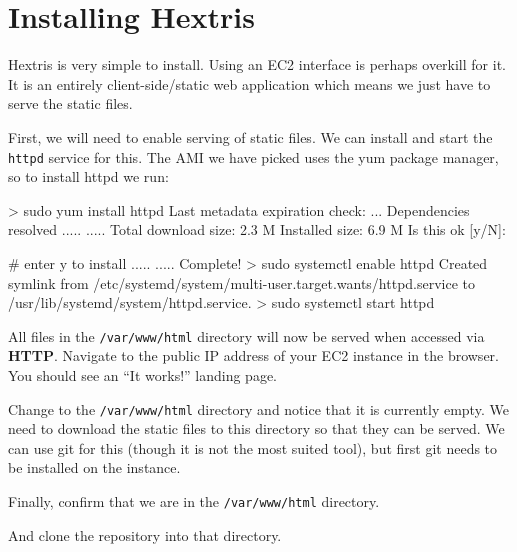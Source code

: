 \documentclass{csse4400}
\begin{document}
\section{Installing Hextris}\label{sec:installHextris}
Hextris \cite{hextris} is very simple to install. Using an EC2 interface is perhaps overkill for it.
It is an entirely client-side/static web application which means we just have to serve the static files.

First, we will need to enable serving of static files.
We can install and start the \texttt{httpd} service for this.
The AMI we have picked uses the yum package manager, so to install httpd we run:

\begin{code}[language=bash,numbers=none]{}
> sudo yum install httpd
Last metadata expiration check: ...
Dependencies resolved
..... 
..... 
Total download size: 2.3 M
Installed size: 6.9 M
Is this ok [y/N]:

# enter y to install
..... 
..... 
Complete!
> sudo systemctl enable httpd
Created symlink from /etc/systemd/system/multi-user.target.wants/httpd.service to /usr/lib/systemd/system/httpd.service.
> sudo systemctl start httpd
\end{code}

All files in the \texttt{/var/www/html} directory will now be served when accessed via \textbf{HTTP}.
Navigate to the public IP address of your EC2 instance in the browser.
You should see an ``It works!'' landing page.

Change to the \texttt{/var/www/html} directory and notice that it is currently empty.
We need to download the static files to this directory so that they can be served.
We can use git for this (though it is not the most suited tool),
but first git needs to be installed on the instance.


Finally, confirm that we are in the \texttt{/var/www/html} directory.



And clone the repository into that directory.


\end{document}

